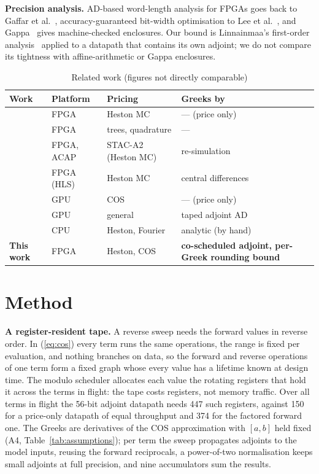 \documentclass[conference]{IEEEtran}
\begin{document}
\textbf{Precision analysis.} AD-based word-length analysis for FPGAs goes back to Gaffar et
al.~\cite{gaffar}, accuracy-guaranteed bit-width optimisation to Lee et al.~\cite{lee06}, and
Gappa~\cite{gappa} gives machine-checked enclosures. Our bound is Linnainmaa's first-order
analysis~\cite{linnainmaa} applied to a datapath that contains its own adjoint; we do not compare
its tightness with affine-arithmetic or Gappa enclosures.

\begin{table}[!t]
\centering
\caption{Related work (figures not directly comparable)}
\label{tab:related}
\footnotesize
\setlength{\tabcolsep}{2.5pt}
\begin{tabular}{@{}L{2.2cm}L{1.5cm}L{2.0cm}L{2.5cm}@{}}
\toprule
\textbf{Work} & \textbf{Platform} & \textbf{Pricing} & \textbf{Greeks by}\\
\midrule
\cite{deschryver,deschryver13} & FPGA & Heston MC & --- (price only)\\
\cite{jin,tse} & FPGA & trees, quadrature & ---\\
\cite{klai,klaih2rc,klai24} & FPGA, ACAP & STAC-A2 (Heston MC) & re-simulation\\
\cite{vitisquant} & FPGA (HLS) & Heston MC & central differences\\
\cite{zhang09,zhang14} & GPU & COS & --- (price only)\\
\cite{gremse} & GPU & general & taped adjoint AD\\
\cite{cui} & CPU & Heston, Fourier & analytic (by hand)\\
\midrule
\textbf{This work} & FPGA & Heston, COS & \textbf{co-scheduled adjoint, per-Greek rounding bound}\\
\bottomrule
\end{tabular}
\end{table}

\section{Method}
\label{sec:method}
\textbf{A register-resident tape.} A reverse sweep needs the forward values in reverse order. In
(\ref{eq:cos}) every term runs the same operations, the range is fixed per evaluation, and nothing
branches on data, so the forward and reverse operations of one term form a fixed graph whose every
value has a lifetime known at design time. The modulo scheduler allocates each value the rotating
registers that hold it across the terms in flight: the tape costs registers, not memory traffic.
Over all terms in flight the 56-bit adjoint datapath needs 447 such registers, against 150 for a
price-only datapath of equal throughput and 374 for the factored forward one. The Greeks are
derivatives of the COS approximation with $[a,b]$ held fixed (A4, Table~\ref{tab:assumptions});
per term the sweep propagates adjoints to the model inputs, reusing the forward reciprocals, a
power-of-two normalisation keeps small adjoints at full precision, and nine accumulators sum the
results.
\end{document}
